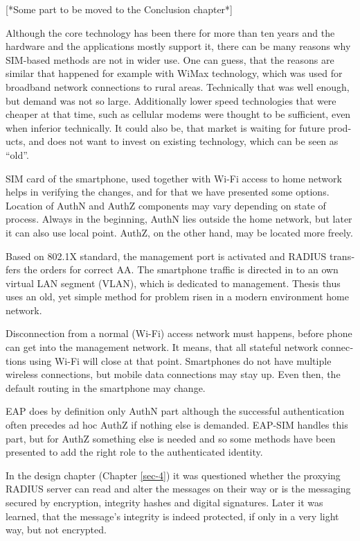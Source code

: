 \documentclass[12pt,a4paper,english]{tutthesis}
\begin{document}
\begin{otherlanguage}{english}
[*Some part to be moved to the Conclusion chapter*]

Although the core technology has been there for more than ten years and
the hardware and the applications mostly support it, 
there can be many reasons why SIM-based methods are not in wider use. 
One can guess, that the reasons are similar that happened for example with 
WiMax technology, which was used for broadband network connections to
rural areas. Technically that was well enough, but demand was not so
large. Additionally lower speed technologies that were cheaper at that
time, such as cellular modems were thought to be sufficient, even when
inferior technically.
It could also be, that market is waiting for future products, and does 
not want to invest on existing technology, which can be seen as ``old''.



SIM card of the smartphone, used together with Wi-Fi access to home network 
helps in verifying the changes, and for that we have presented some options.
Location of AuthN and AuthZ components may vary depending on state of process.
Always in the beginning, AuthN lies outside the home network, but
later it can also use local point. AuthZ, on the other hand, may be located more freely.

Based on 802.1X standard, the management port is activated and
RADIUS transfers the orders for correct AA.
The smartphone traffic is directed in to an own virtual LAN segment (VLAN),
which is dedicated to management.
Thesis thus uses an old, yet simple method for problem risen in a modern environment home network.

Disconnection from a normal (Wi-Fi) access network must happens, before phone can get
into the management network. It means, that all stateful network
connections using Wi-Fi will close at that point. Smartphones do not
have multiple wireless connections, but mobile data connections may 
stay up. Even then, the default routing in the smartphone may change.


EAP does by definition only AuthN part although the successful
authentication often precedes ad hoc AuthZ if nothing else is demanded.
EAP-SIM handles this part, but for AuthZ something else is needed
and so some methods have been presented to add the right role to 
the authenticated identity.



In the design chapter (Chapter \ref{sec-4}) it was questioned whether the proxying RADIUS server
can read and alter the messages on their way or is the messaging secured
by encryption, integrity hashes and digital signatures.
Later it was learned, that the message's integrity is indeed protected, if
only in a very light way, but not encrypted.


\end{otherlanguage}
\end{document}
